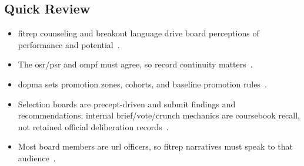 \documentclass[../main.tex]{subfiles}
\begin{document}
\subsection{Quick Review}
\begin{itemize}
  \item \ac{fitrep} counseling and breakout language drive board perceptions of performance and potential~\autocite{edo-5-2-3-career-topics-2025}.
  \item The \ac{osr}/\ac{psr} and \ac{ompf} must agree, so record continuity matters~\autocite{edo-5-2-3-career-topics-2025,MyNavyHR-Officer-Record-Update-2026}.
  \item \ac{dopma} sets promotion zones, cohorts, and baseline promotion rules~\autocite{edo-5-2-3-career-topics-2025}.
  \item Selection boards are precept-driven and submit findings and recommendations; internal brief/vote/crunch
  mechanics are coursebook recall, not retained official deliberation records~\autocite{edo-5-2-3-career-topics-2025,MyNavyHR-Selection-Boards-2026}.
  \item Most board members are \ac{url} officers, so \ac{fitrep} narratives must speak to that audience~\autocite{edo-5-2-3-career-topics-2025}.
\end{itemize}

\end{document}
